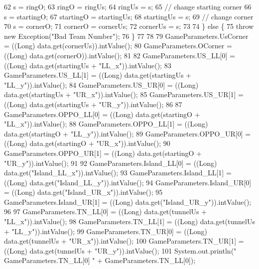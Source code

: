\begin{DoxyCode}
62         s = ringO;
63         ringO = ringUs;
64         ringUs = s;
65         \textcolor{comment}{// change starting corner}
66         s = startingO;
67         startingO = startingUs;
68         startingUs = s;
69         \textcolor{comment}{// change corner}
70         s = cornerO;
71         cornerO = cornerUs;
72         cornerUs = s;
73 
74       \} \textcolor{keywordflow}{else} \{
75         \textcolor{keywordflow}{throw} \textcolor{keyword}{new} Exception(\textcolor{stringliteral}{"Bad Team Number"});
76       \}
77 
78 
79       GameParameters.UsCorner = ((Long) data.get(cornerUs)).intValue();
80       GameParameters.OCorner = ((Long) data.get(cornerO)).intValue();
81 
82       GameParameters.US\_LL[0] = ((Long) data.get(startingUs + \textcolor{stringliteral}{"LL\_x"})).intValue();
83       GameParameters.US\_LL[1] = ((Long) data.get(startingUs + \textcolor{stringliteral}{"LL\_y"})).intValue();
84       GameParameters.US\_UR[0] = ((Long) data.get(startingUs + \textcolor{stringliteral}{"UR\_x"})).intValue();
85       GameParameters.US\_UR[1] = ((Long) data.get(startingUs + \textcolor{stringliteral}{"UR\_y"})).intValue();
86 
87       GameParameters.OPPO\_LL[0] = ((Long) data.get(startingO + \textcolor{stringliteral}{"LL\_x"})).intValue();
88       GameParameters.OPPO\_LL[1] = ((Long) data.get(startingO + \textcolor{stringliteral}{"LL\_y"})).intValue();
89       GameParameters.OPPO\_UR[0] = ((Long) data.get(startingO + \textcolor{stringliteral}{"UR\_x"})).intValue();
90       GameParameters.OPPO\_UR[1] = ((Long) data.get(startingO + \textcolor{stringliteral}{"UR\_y"})).intValue();
91 
92       GameParameters.Island\_LL[0] = ((Long) data.get(\textcolor{stringliteral}{"Island\_LL\_x"})).intValue();
93       GameParameters.Island\_LL[1] = ((Long) data.get(\textcolor{stringliteral}{"Island\_LL\_y"})).intValue();
94       GameParameters.Island\_UR[0] = ((Long) data.get(\textcolor{stringliteral}{"Island\_UR\_x"})).intValue();
95       GameParameters.Island\_UR[1] = ((Long) data.get(\textcolor{stringliteral}{"Island\_UR\_y"})).intValue();
96 
97       GameParameters.TN\_LL[0] = ((Long) data.get(tunnelUs + \textcolor{stringliteral}{"LL\_x"})).intValue();
98       GameParameters.TN\_LL[1] = ((Long) data.get(tunnelUs + \textcolor{stringliteral}{"LL\_y"})).intValue();
99       GameParameters.TN\_UR[0] = ((Long) data.get(tunnelUs + \textcolor{stringliteral}{"UR\_x"})).intValue();
100       GameParameters.TN\_UR[1] = ((Long) data.get(tunnelUs + \textcolor{stringliteral}{"UR\_y"})).intValue();
101       System.out.println(\textcolor{stringliteral}{" GameParameters.TN\_LL[0] "} + GameParameters.TN\_LL[0]);

\end{DoxyCode}
